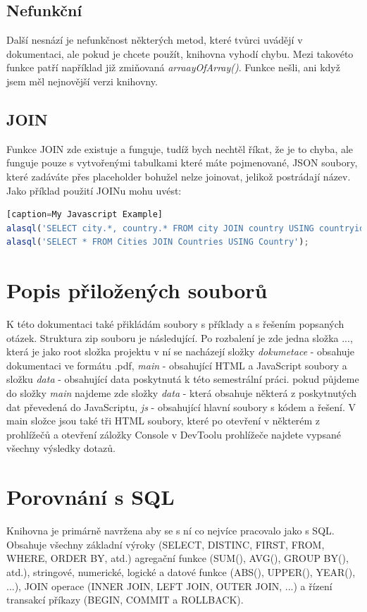 \documentclass[a4, titlepage]{article}
\begin{document}
\subsection{Nefunkční}
Další nesnází je nefunkčnost některých metod, které tvůrci uvádějí v dokumentaci, ale pokud je chcete použít, knihovna vyhodí chybu. Mezi takovéto funkce patří například již zmiňovaná \textit{arraayOfArray()}.
Funkce nešli, ani když jsem měl nejnovější verzi knihovny.

\subsection{JOIN}
Funkce JOIN zde existuje a funguje, tudíž bych nechtěl říkat, že je to chyba, ale funguje pouze s vytvořenými tabulkami které máte pojmenované, JSON soubory, které zadáváte přes placeholder bohužel nelze joinovat, jelikož postrádají název. Jako příklad použití JOINu mohu uvést:
\begin{lstlisting}[language=JavaScript][caption=My Javascript Example]
alasql('SELECT city.*, country.* FROM city JOIN country USING countryid');
alasql('SELECT * FROM Cities JOIN Countries USING Country');
\end{lstlisting}

\section{Popis přiložených souborů}
K této dokumentaci také přikládám soubory s příklady a s řešením popsaných otázek. Struktura zip souboru je následující. Po rozbalení je zde jedna složka ..., která je jako root složka projektu v ní se nacházejí složky \textit{dokumetace} - obsahuje dokumentaci ve formátu .pdf, \textit{main} - obsahující HTML a JavaScript soubory a složku \textit{data} - obsahující data poskytnutá k této semestrální práci. pokud půjdeme do složky \textit{main} najdeme zde složky  \textit{data} - která obsahuje některá z poskytnutých dat převedená do JavaScriptu, \textit{js} - obsahující hlavní soubory s kódem a řešení. V main složce jsou také tři HTML soubory, které po otevření v některém z prohlížečů a otevření záložky Console v DevToolu prohlížeče najdete vypsané všechny výsledky dotazů. 

\section{Porovnání s SQL}
Knihovna je primárně navržena aby se s ní co nejvíce pracovalo jako s SQL. Obsahuje všechny základní výroky (SELECT, DISTINC, FIRST, FROM, WHERE, ORDER BY, atd.) agregační funkce (SUM(), AVG(), GROUP BY(), atd.), stringové, numerické, logické a datové funkce (ABS(), UPPER(), YEAR(), ...), JOIN operace (INNER JOIN, LEFT JOIN, OUTER JOIN, ...) a řízení transakcí příkazy (BEGIN, COMMIT a ROLLBACK). 
\end{document}
